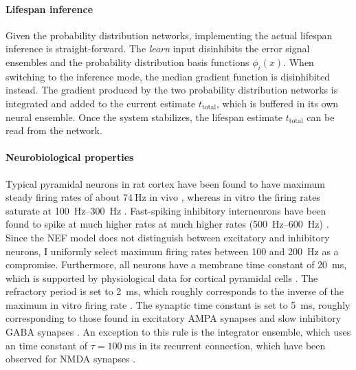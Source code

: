 \documentclass[a4paper,11pt]{article}
\begin{document}
\paragraph{Lifespan inference}
Given the probability distribution networks, implementing the actual lifespan inference is straight-forward. The \emph{learn} input disinhibits the error signal ensembles and the probability distribution basis functions $\phi_i(x)$. When switching to the inference mode, the median gradient function is disinhibited instead. The gradient produced by the two probability distribution networks is integrated and added to the current estimate $t_\mathrm{total}$, which is buffered in its own neural ensemble. Once the system stabilizes, the lifespan estimate $t_\mathrm{total}$ can be read from the network.

\paragraph{Neurobiological properties}
Typical pyramidal neurons in rat cortex have been found to have maximum steady firing rates of about $\SI{74}{\hertz}$ in vivo \cite{schwindt1997quantitative}, whereas in vitro the firing rates saturate at \SIrange{100}{300}{\hertz} \cite{mccormick1985comparative}. Fast-spiking inhibitory interneurons have been found to spike at much higher rates at much higher rates (\SIrange{500}{600}{\hertz}) \cite{azouz1997physiological}. Since the NEF model does not distinguish between excitatory and inhibitory neurons, I uniformly select maximum firing rates between 100 and \SI{200}{\hertz} as a compromise. Furthermore, all neurons have a membrane time constant of \SI{20}{\milli\second}, which is supported by physiological data for cortical pyramidal cells \cite{mccormick1985comparative}. The refractory period is set to \SI{2}{\milli\second}, which roughly corresponds to the inverse of the maximum in vitro firing rate \cite{mccormick1985comparative}. The synaptic time constant is set to \SI{5}{\milli\second}, roughly corresponding to those found in excitatory AMPA synapses and slow inhibitory GABA synapses \cite{azouz1997physiological,bartos2002fast}. An exception to this rule is the integrator ensemble, which uses an time constant of $\tau = \SI{100}{\milli\second}$ in its recurrent connection, which have been observed for NMDA synapses \cite{flint1997nr2a}.
\end{document}
